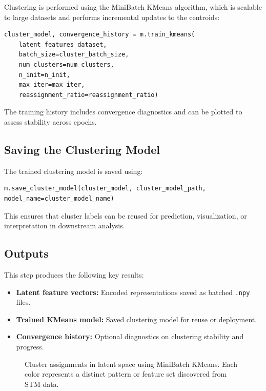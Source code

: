 \documentclass[11pt]{article}
\begin{document}
Clustering is performed using the MiniBatch KMeans algorithm, which is scalable to large datasets and performs incremental updates to the centroids:

\begin{verbatim}
cluster_model, convergence_history = m.train_kmeans(
    latent_features_dataset,
    batch_size=cluster_batch_size,
    num_clusters=num_clusters,
    n_init=n_init,
    max_iter=max_iter,
    reassignment_ratio=reassignment_ratio)
\end{verbatim}

The training history includes convergence diagnostics and can be plotted to assess stability across epochs.

\subsection*{Saving the Clustering Model}

The trained clustering model is saved using:

\begin{verbatim}
m.save_cluster_model(cluster_model, cluster_model_path, model_name=cluster_model_name)
\end{verbatim}

This ensures that cluster labels can be reused for prediction, visualization, or interpretation in downstream analysis.

\subsection*{Outputs}

This step produces the following key results:

\begin{itemize}
  \item \textbf{Latent feature vectors:} Encoded representations saved as batched \texttt{.npy} files.
  \item \textbf{Trained KMeans model:} Saved clustering model for reuse or deployment.
  \item \textbf{Convergence history:} Optional diagnostics on clustering stability and progress.
\end{itemize}

\begin{figure}[H]
\centering
\caption{Cluster assignments in latent space using MiniBatch KMeans. Each color represents a distinct pattern or feature set discovered from STM data.}
\end{figure}
\end{document}
